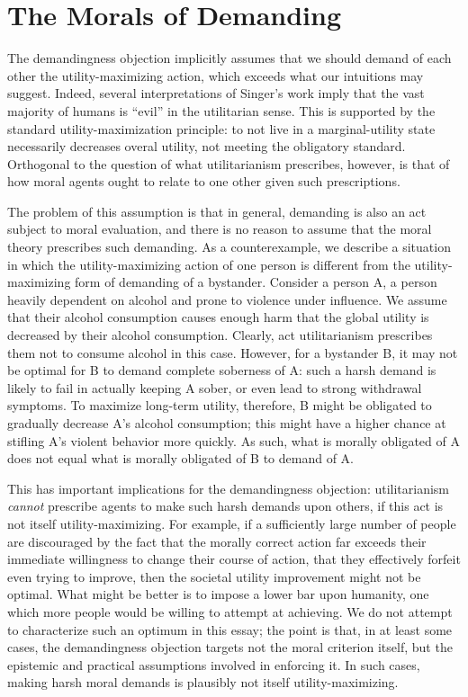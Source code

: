 \documentclass[11pt]{article}
\begin{document}
\section{The Morals of Demanding}

The demandingness objection implicitly assumes that we should demand of each other
the utility-maximizing action, which exceeds what our intuitions may suggest.
Indeed, several interpretations of Singer's work imply that the
vast majority of humans is ``evil'' in the utilitarian sense.
This is supported by the standard utility-maximization principle:
to not live in a marginal-utility state necessarily decreases overal utility,
not meeting the obligatory standard.
Orthogonal to the question of what utilitarianism prescribes, however,
is that of how moral agents ought to relate to one other given such prescriptions.

The problem of this assumption is that in general,
demanding is also an act subject to moral evaluation,
and there is no reason to assume that the moral theory prescribes such demanding.
As a counterexample, we describe a situation in which the utility-maximizing action of one person
is different from the utility-maximizing form of demanding of a bystander.
Consider a person A, a person heavily dependent on alcohol and prone to violence under influence.
We assume that their alcohol consumption causes enough harm that the global utility is decreased by their alcohol consumption.
Clearly, act utilitarianism prescribes them not to consume alcohol in this case.
However, for a bystander B, it may not be optimal for B to demand complete soberness of A:
such a harsh demand is likely to fail in actually keeping A sober,
or even lead to strong withdrawal symptoms.
To maximize long-term utility, therefore, B might be obligated
to gradually decrease A's alcohol consumption;
this might have a higher chance at stifling A's violent behavior more quickly.
As such, what is morally obligated of A does not equal
what is morally obligated of B to demand of A.

This has important implications for the demandingness objection:
utilitarianism \emph{cannot} prescribe agents to make such harsh demands upon others,
if this act is not itself utility-maximizing.
For example, if a sufficiently large number of people are discouraged
by the fact that the morally correct action far exceeds their immediate willingness to change their course of action,
that they effectively forfeit even trying to improve,
then the societal utility improvement might not be optimal.
What might be better is to impose a lower bar upon humanity,
one which more people would be willing to attempt at achieving.
We do not attempt to characterize such an optimum in this essay;
the point is that, in at least some cases,
the demandingness objection targets not the moral criterion itself,
but the epistemic and practical assumptions involved in enforcing it.
In such cases, making harsh moral demands is plausibly not itself utility-maximizing.

\printbibliography
\end{document}
